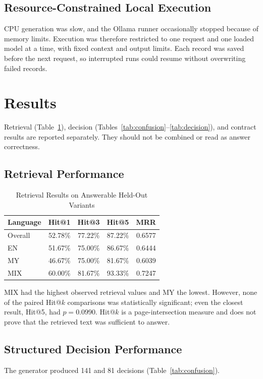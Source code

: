 \documentclass[a4paper,conference]{IEEEtran}
\newcommand{\code}[1]{\texttt{\detokenize{#1}}}
\begin{document}
\subsection{Resource-Constrained Local Execution}
CPU generation was slow, and the Ollama runner occasionally stopped because of memory limits. Execution was therefore restricted to one request and one loaded model at a time, with fixed context and output limits. Each record was saved before the next request, so interrupted runs could resume without overwriting failed records.

\section{Results}
Retrieval (Table~\ref{tab:retrieval}), decision (Tables~\ref{tab:confusion}--\ref{tab:decision}), and contract results are reported separately. They should not be combined or read as answer correctness.

\subsection{Retrieval Performance}
\begin{table}[t]
\caption{Retrieval Results on Answerable Held-Out Variants}
\label{tab:retrieval}
\centering
\footnotesize
\begin{tabular}{|l|r|r|r|r|}
\hline
Language & Hit@1 & Hit@3 & Hit@5 & MRR \\
\hline
Overall & 52.78\% & 77.22\% & 87.22\% & 0.6577 \\
\hline
EN      & 51.67\% & 75.00\% & 86.67\% & 0.6444 \\
\hline
MY      & 46.67\% & 75.00\% & 81.67\% & 0.6039 \\
\hline
MIX     & 60.00\% & 81.67\% & 93.33\% & 0.7247 \\
\hline
\end{tabular}
\end{table}

MIX had the highest observed retrieval values and MY the lowest. However, none of the paired Hit@$k$ comparisons was statistically significant; even the closest result, Hit@5, had $p=0.0990$. Hit@$k$ is a page-intersection measure and does not prove that the retrieved text was sufficient to answer.

\subsection{Structured Decision Performance}
The generator produced 141 \code{ANSWER} and 81 \code{ABSTAIN} decisions (Table~\ref{tab:confusion}).
\end{document}
